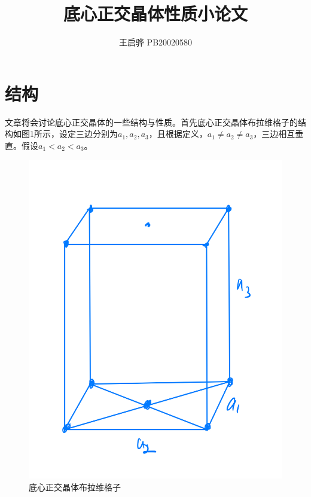 \documentclass{article}
\title{\songti \zihao{2}\bfseries 底心正交晶体性质小论文}
\author{王启骅 PB20020580}
\begin{document}
	\maketitle
	\section{结构}
	文章将会讨论底心正交晶体的一些结构与性质。首先底心正交晶体布拉维格子的结构如图1所示，设定三边分别为$ a_1,a_2,a_3 $，且根据定义，$ a_1\neq a_2\neq a_3 $，三边相互垂直。假设$ a_1<a_2<a_3 $。
	\begin{figure}[!h]
		
		\centering
		\includegraphics[scale=0.2]{1}
		\caption{\heiti{}底心正交晶体布拉维格子}
		
	\end{figure}
	
\end{document}
